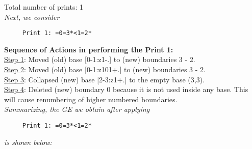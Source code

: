\documentclass[final]{article}
\begin{document}
Total number of prints: 1\\
{\em Next, we consider}
\begin{verbatim}
     Print 1: =0=3*<1=2*
\end{verbatim}
{\bf Sequence of Actions in performing the Print 1:}\\
{\underline{Step 1}:} Moved (old) base [0-1:z1-.]  to (new) boundaries 3 - 2.\\
{\underline{Step 2}:} Moved (old) base [0-1:z101+.]  to (new) boundaries 3 - 2.\\
{\underline{Step 3}:} Collapsed (new) base [2-3:z1+.]  to the empty base (3,3).
\\
{\underline{Step 4}:} Deleted (new) boundary 0 because it is not used inside any base.  This will cause renumbering of higher numbered boundaries.
\\[0.1in]
{\em Summarizing, the GE we obtain after applying}
\begin{verbatim}
     Print 1: =0=3*<1=2*
\end{verbatim}
{\em is shown below:}
\end{document}
